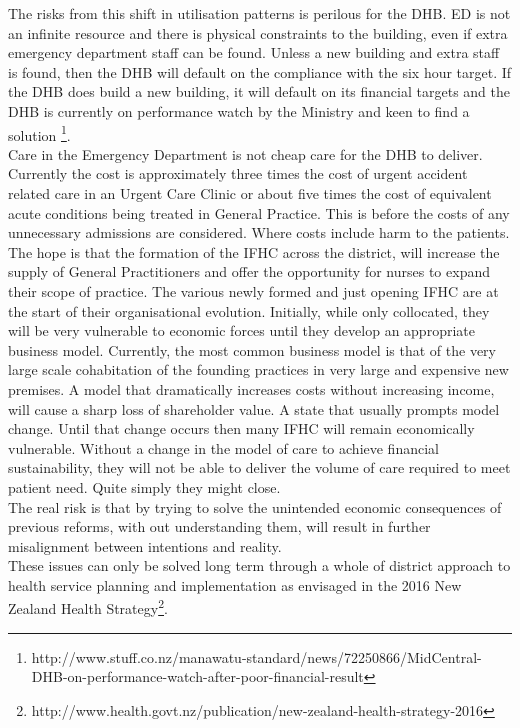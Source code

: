 \documentclass[11pt,a4paper]{article}
\begin{document}
The risks from this shift in utilisation patterns is perilous for the DHB. ED is not an infinite resource and there is physical constraints to the building, even if extra emergency department staff can be found. Unless a new building and extra staff is found, then the DHB will default on the compliance with the six hour target. If the DHB does build a new building, it will default on its financial targets and the DHB is currently on performance watch by the Ministry and keen to find a solution \footnote{http://www.stuff.co.nz/manawatu-standard/news/72250866/MidCentral-DHB-on-performance-watch-after-poor-financial-result}. \\

Care in the Emergency Department is not cheap care for the DHB to deliver. Currently the cost is approximately three times the cost of urgent accident related care in an Urgent Care Clinic or about five times the cost of equivalent acute conditions being treated in General Practice. This is before the costs of any unnecessary admissions are considered. Where costs include harm to the patients.\\

The hope is that the formation of the IFHC across the district, will increase the supply of General Practitioners and offer the opportunity for nurses to expand their scope of practice. The various newly formed and just opening IFHC are at the start of their organisational evolution. Initially, while only collocated, they will be very vulnerable to economic forces until they develop an appropriate business model. Currently, the most common business model is that of the very large scale cohabitation of the founding practices in very large and expensive new premises. A model that dramatically increases costs without increasing income, will cause a sharp loss of shareholder value. A state that usually prompts model change. Until that change occurs then many IFHC will remain economically vulnerable. Without a change in the model of care to achieve financial sustainability, they will not be able to deliver the volume of care required to meet patient need. Quite simply they might close.\\

The real risk is that by trying to solve the unintended economic consequences of previous reforms, with out understanding them, will result in further misalignment between intentions and reality\citep{kerr1995folly}.\\

These issues can only be solved long term through a whole of district approach to health service planning and implementation as envisaged in the 2016 New Zealand Health Strategy\footnote{http://www.health.govt.nz/publication/new-zealand-health-strategy-2016}.\\
\end{document}

